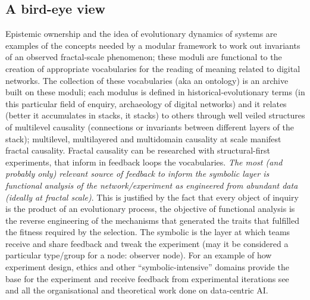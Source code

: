 \documentclass[14pt]{extarticle}
\begin{document}
\subsection*{A bird-eye view}
\label{subsec:bird-eye}

\hspace*{15mm}Epistemic ownership and the idea of evolutionary dynamics of systems are examples of the concepts needed by a modular framework to work out invariants of an observed fractal-scale phenomenon; these moduli are functional to the creation of appropriate vocabularies for the reading of meaning related to digital networks. The collection of these vocabularies (aka an ontology) is an archive built on these moduli; each modulus is defined in historical-evolutionary terms (in this particular field of enquiry, archaeology of digital networks) and it relates (better it accumulates in stacks, it stacks) to others through well veiled structures of multilevel causality \cite{ScholarMultilevel} (connections or invariants between different layers of the stack); multilevel, multilayered and multidomain causality at scale manifest fractal causality. Fractal causality can be researched with structural-first experiments, that inform in feedback loops the vocabularies. \textit{The most (and probably only) relevant source of feedback to inform the symbolic layer is functional analysis of the network/experiment as engineered from abundant data (ideally at fractal scale)}. This is justified by the fact that every object of inquiry is the product of an evolutionary process, the objective of functional analysis is the reverse engineering of the mechanisms that generated the traits that fulfilled the fitness required by the selection. The symbolic is the layer at which teams receive and share feedback and tweak the experiment (may it be considered a particular type/group for a node: observer node). For an example of how experiment design, ethics and other “symbolic-intensive” domains provide the base for the experiment and receive feedback from experimental iterations see \cite{Andrewng} and all the organisational and theoretical work done on data-centric AI.
\newline
\end{document}
